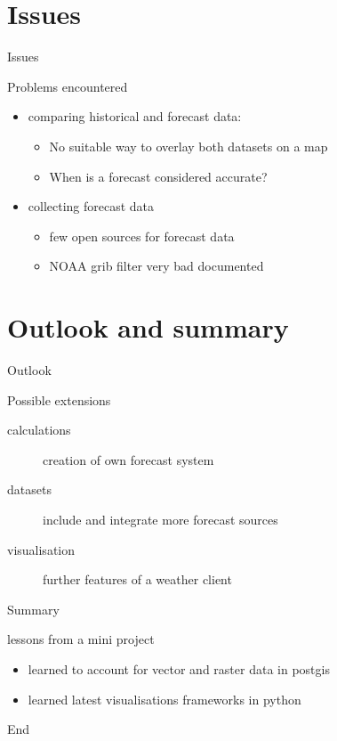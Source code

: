 \documentclass[ucs,9pt]{beamer}
\begin{document}
\section{Issues}
\begin{frame}{Issues}
	\begin{block}{Problems encountered}
		\begin{itemize}
			\item comparing historical and forecast data:
				\begin{itemize}
					\item No suitable way to overlay both datasets on a map
					\item When is a forecast considered accurate?
				\end{itemize}
			\item collecting forecast data
				\begin{itemize}
					\item few open sources for forecast data
					\item NOAA grib filter very bad documented 
				\end{itemize}
		\end{itemize}
	\end{block}
\end{frame}

\section{Outlook and summary}
\begin{frame}{Outlook}
		\begin{block}{Possible extensions}
			\begin{description}
				\item [calculations] creation of own forecast system
				\item [datasets] include and integrate more forecast sources
				\item [visualisation] further features of a weather client
			\end{description}
		\end{block}
\end{frame}

\begin{frame}{Summary}
	\begin{block}{lessons from a mini project}
			\begin{itemize}
				\item learned to account for vector and raster data in postgis
				\item learned latest visualisations frameworks in python
			\end{itemize}
	\end{block}
\end{frame}

\begin{frame}{End}
  \\
  \\
\end{frame}
\end{document}
